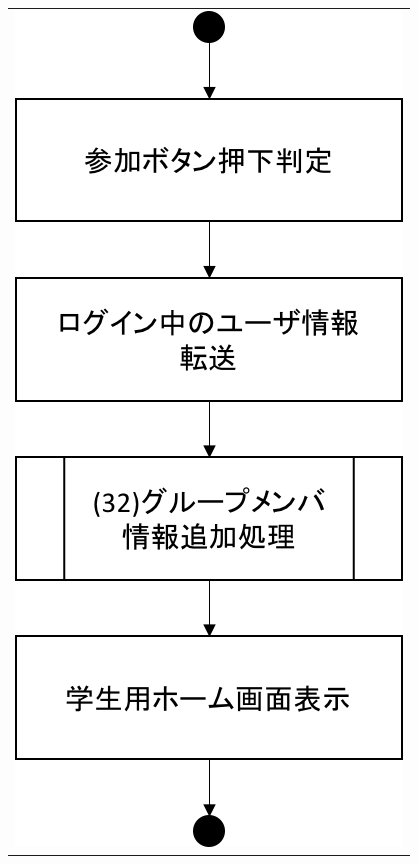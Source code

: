 \begin{figure}[htbp]
\begin{tabular}{c}
\begin{minipage}{0.33\hsize}
\begin{center}
  \end{center}
 \end{minipage}
 \begin{minipage}{0.33\hsize}
  \begin{center}
   \includegraphics[width=0.8\linewidth,clip]{./img/flow/31.png}
  \end{center}
 \end{minipage}
 \begin{minipage}{0.33\hsize}
  \begin{center}

\end{center}
\end{minipage}
\end{tabular}
\end{figure}
